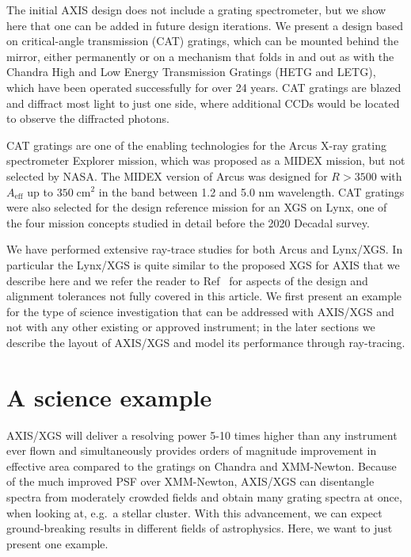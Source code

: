 \documentclass[12pt]{spieman}  %
\begin{document}
\begin{spacing}{1}
The initial AXIS design does not include a grating spectrometer, but we show here that one can be added in future design iterations.
We present a design based on critical-angle transmission (CAT) gratings, which can be mounted behind the mirror, either permanently or on a mechanism that folds in and out as with the Chandra High and Low Energy Transmission Gratings (HETG\cite{2005PASP..117.1144C} and LETG\cite{2000APS..APR.J8005B}), which have been operated successfully for over 24 years. CAT gratings are blazed and diffract most light to just one side, where additional CCDs would be located to observe the diffracted photons.

CAT gratings\cite{heilmann:11,doi:10.1117/12.2188525} are one of the enabling technologies for the Arcus X-ray grating spectrometer Explorer mission\cite{doi:10.1117/12.2272818}, which was proposed as a MIDEX mission, but not selected by NASA. The MIDEX version of Arcus was designed for $R > 3500$ with $A_\mathrm{eff}$ up to $350\;\mathrm{cm}^2$ in the band between 1.2 and 5.0 nm wavelength. CAT gratings were also selected for the design reference mission for an XGS on Lynx\cite{10.1117/1.JATIS.5.2.021003}, one of the four mission concepts studied in detail before the 2020 Decadal survey\cite{10.1117/1.JATIS.5.2.021001}.

We have performed extensive ray-trace studies for both Arcus\cite{doi:10.1117/12.2273011,guntherarcus} and Lynx/XGS\cite{10.1117/1.JATIS.5.2.021003}. In particular the Lynx/XGS is quite similar to the proposed XGS for AXIS that we describe here and we refer the reader to Ref~ for aspects of the design and alignment tolerances not fully covered in this article.
We first present an example for the type of science investigation that can be addressed with AXIS/XGS and not with any other existing or approved instrument; in the later sections we describe the layout of AXIS/XGS and model its performance through ray-tracing.

\section{A science example}
AXIS/XGS will deliver a resolving power 5-10 times higher than any instrument ever flown and simultaneously provides orders of magnitude improvement in effective area compared to the gratings on Chandra and XMM-Newton. Because of the much improved PSF over XMM-Newton, AXIS/XGS can disentangle spectra from moderately crowded fields and obtain many grating spectra at once, when looking at, e.g.\ a stellar cluster.
With this advancement, we can expect ground-breaking results in different fields of astrophysics. Here, we want to just present one example.


\end{spacing}
\end{document}
